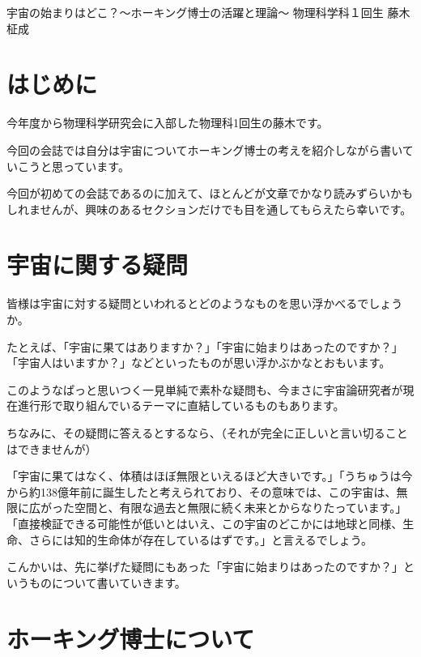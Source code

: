 \documentclass[10pt,b5paper,papersize,dvipdfmx]{jsbook}
\begin{document}


\kaishititle%
  {宇宙の始まりはどこ？～ホーキング博士の活躍と理論～}%
  {物理科学科１回生}%
  {藤木 柾成}%

%
\section*{はじめに}
今年度から物理科学研究会に入部した物理科1回生の藤木です。\par
今回の会誌では自分は宇宙についてホーキング博士の考えを紹介しながら書いていこうと思っています。\par
今回が初めての会誌であるのに加えて、ほとんどが文章でかなり読みずらいかもしれませんが、興味のあるセクションだけでも目を通してもらえたら幸いです。\par




%
\section{宇宙に関する疑問}
皆様は宇宙に対する疑問といわれるとどのようなものを思い浮かべるでしょうか。\par
たとえば、「宇宙に果てはありますか？」「宇宙に始まりはあったのですか？」「宇宙人はいますか？」などといったものが思い浮かぶかなとおもいます。\par
このようなぱっと思いつく一見単純で素朴な疑問も、今まさに宇宙論研究者が現在進行形で取り組んでいるテーマに直結しているものもあります。\par
ちなみに、その疑問に答えるとするなら、（それが完全に正しいと言い切ることはできませんが）\par
「宇宙に果てはなく、体積はほぼ無限といえるほど大きいです。」「うちゅうは今から約138億年前に誕生したと考えられており、その意味では、この宇宙は、無限に広がった空間と、有限な過去と無限に続く未来とからなりたっています。」「直接検証できる可能性が低いとはいえ、この宇宙のどこかには地球と同様、生命、さらには知的生命体が存在しているはずです。」と言えるでしょう。\par
こんかいは、先に挙げた疑問にもあった「宇宙に始まりはあったのですか？」というものについて書いていきます。\par




\section{ ホーキング博士について}
\end{document}
